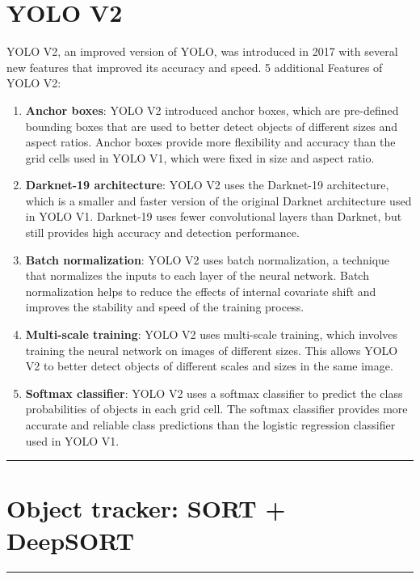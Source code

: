 \documentclass[a4paper]{article}
\begin{document}
\section{YOLO V2 }
YOLO V2, an improved version of YOLO, was introduced in 2017 with several new features that improved its accuracy and speed. 5 additional Features of YOLO V2:
\begin{enumerate}
\item \textbf{Anchor boxes}: YOLO V2 introduced anchor boxes, which are pre-defined bounding boxes that are used to better detect objects of different sizes and aspect ratios. Anchor boxes provide more flexibility and accuracy than the grid cells used in YOLO V1, which were fixed in size and aspect ratio.
\item \textbf{Darknet-19 architecture}: YOLO V2 uses the Darknet-19 architecture, which is a smaller and faster version of the original Darknet architecture used in YOLO V1. Darknet-19 uses fewer convolutional layers than Darknet, but still provides high accuracy and detection performance.
\item \textbf{Batch normalization}: YOLO V2 uses batch normalization, a technique that normalizes the inputs to each layer of the neural network. Batch normalization helps to reduce the effects of internal covariate shift and improves the stability and speed of the training process.
\item \textbf{Multi-scale training}: YOLO V2 uses multi-scale training, which involves training the neural network on images of different sizes. This allows YOLO V2 to better detect objects of different scales and sizes in the same image.
\item \textbf{Softmax classifier}: YOLO V2 uses a softmax classifier to predict the class probabilities of objects in each grid cell. The softmax classifier provides more accurate and reliable class predictions than the logistic regression classifier used in YOLO V1.
\end{enumerate}
\par\noindent\rule{\textwidth}{0.4pt}
\pagebreak
\section{Object tracker: SORT + DeepSORT}
\par\noindent\rule{\textwidth}{0.4pt}
\end{document}
